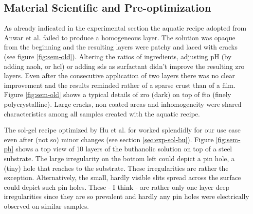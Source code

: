 \subsection{Material Scientific and Pre-optimization}
As already indicated in the experimental section the aquatic recipe adopted from Anwar et al.\cite{Anwar2017} failed to produce a homogeneous layer. 
The solution was opaque from the beginning and the resulting layers were patchy and laced with cracks (see figure \ref{fig:sem-old}). 
Altering the ratios of ingredients, adjusting pH (by adding \gls{naoh},  or \gls{hcl}) or adding \gls{sds} as surfactant didn't improve the resulting \gls{zro} layers. 
Even after the consecutive application of two layers there was no clear improvement and the results reminded rather of a sparse crust than of a film. 
%
Figure \ref{fig:sem-old} shows a typical details of \gls{zro} (dark) on top of \gls{fto} (finely polycrystalline). 
Large cracks, non coated areas and inhomogeneity were 
shared characteristics among 
all samples created with the aquatic recipe. 

The sol-gel recipe optimized by Hu et al.\cite{Hu2016} for  worked splendidly for our use case even after (not so) minor changes (see section \ref{sec:exp-sol-bu}). 
%
Figure \ref{fig:sem-ph} shows a top view of 10 layers of the buthanolic solution on top of a steel substrate. 
The large irregularity on the bottom left could depict a pin hole, a (tiny) hole that reaches to the substrate. 
These irregularities are rather the exception. 
Alternatively, the small, hardly visible slits spread across the surface could depict such pin holes. 
These - I think - are rather only one layer deep irregularities since they are so prevalent
and hardly any pin holes were electrically observed on similar samples. 


